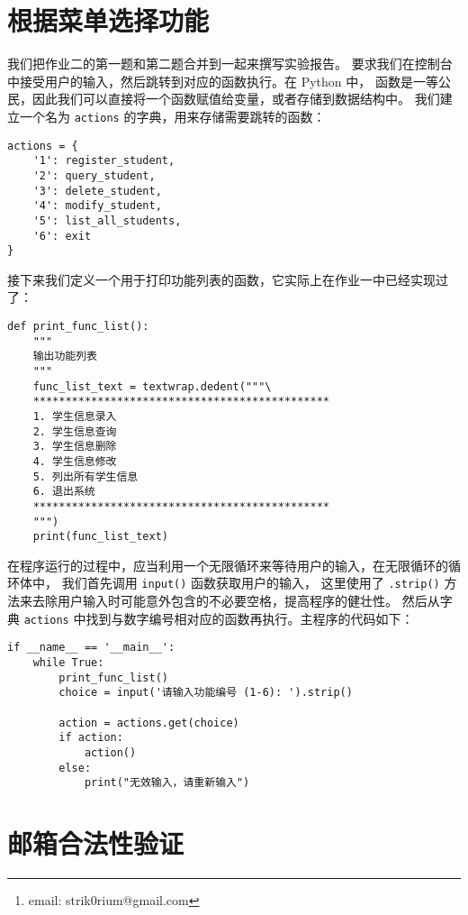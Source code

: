 \documentclass[openany, 10pt]{ctexart}
\title{\thetitle}
\author{Strik0r
\thanks{email: strik0rium@gmail.com}}
\begin{document}


\newpage
{\small \setlength{\parskip}{0em} \tableofcontents}

\section{根据菜单选择功能}

我们把作业二的第一题和第二题合并到一起来撰写实验报告。
要求我们在控制台中接受用户的输入，然后跳转到对应的函数执行。在 Python 中，
函数是一等公民，因此我们可以直接将一个函数赋值给变量，或者存储到数据结构中。
我们建立一个名为 \lstinline|actions| 的字典，用来存储需要跳转的函数：
\begin{lstlisting}
actions = {
    '1': register_student,
    '2': query_student,
    '3': delete_student,
    '4': modify_student,
    '5': list_all_students,
    '6': exit
}
\end{lstlisting}

接下来我们定义一个用于打印功能列表的函数，它实际上在作业一中已经实现过了：
\begin{lstlisting}
def print_func_list():
    """
    输出功能列表
    """
    func_list_text = textwrap.dedent("""\
    **********************************************
    1. 学生信息录入
    2. 学生信息查询
    3. 学生信息删除
    4. 学生信息修改
    5. 列出所有学生信息
    6. 退出系统
    **********************************************
    """)
    print(func_list_text)
\end{lstlisting}

在程序运行的过程中，应当利用一个无限循环来等待用户的输入，在无限循环的循环体中，
我们首先调用 \lstinline|input()| 函数获取用户的输入，
这里使用了 \lstinline|.strip()| 方法来去除用户输入时可能意外包含的不必要空格，提高程序的健壮性。
然后从字典 \lstinline|actions| 中找到与数字编号相对应的函数再执行。主程序的代码如下：
\begin{lstlisting}
if __name__ == '__main__':
    while True:
        print_func_list()
        choice = input('请输入功能编号 (1-6): ').strip()

        action = actions.get(choice)
        if action:
            action()
        else:
            print("无效输入，请重新输入")
\end{lstlisting}

\section{邮箱合法性验证}
\end{document}
